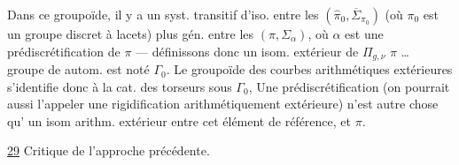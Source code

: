 
Dans ce groupoïde, il y a un syst. transitif d'iso. entre les  $(\widehat{\pi}_0,\overline{\Sigma}_{\pi_0})$ (où $\pi_0$ est un groupe discret à lacets) plus gén. entre les $(\pi,\Sigma_\alpha)$, où $\alpha$  est une prédiscrétification de $\pi$ --- définissons donc un isom.  extérieur de $\Pi_{g,\nu}$
$\pi$ \ldots\  groupe de  autom. est noté $\Gamma_0$. Le  groupoïde des courbes  arithmétiques extérieures s'identifie donc à la cat. des torseurs sous $\Gamma_0$,
Une prédiscrétification (on pourrait aussi l'appeler une rigidification arithmétiquement extérieure) n'est  autre chose qu' un isom arithm. extérieur entre cet élément de référence, et $\pi$.

\uline{29} Critique de l'approche précédente.

